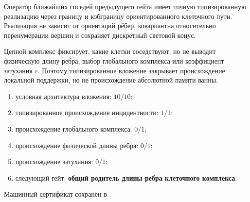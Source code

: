 \begin{theorem}
Оператор ближайших соседей предыдущего гейта имеет точную типизированную
реализацию через границу и кобграницу ориентированного клеточного пути.
Реализация не зависит от ориентаций рёбер, ковариантна относительно
перенумерации вершин и сохраняет дискретный световой конус.
\end{theorem}

\begin{nogocriterion}
Цепной комплекс фиксирует, какие клетки соседствуют, но не выводит физическую
длину ребра, выбор глобального комплекса или коэффициент затухания $r$.
Поэтому типизированное вложение закрывает происхождение локальной поддержки,
но не происхождение абсолютной памяти ванны.
\end{nogocriterion}

\begin{protocol}\begin{enumerate}
\item условная архитектура вложения: \textbf{$10/10$};
\item типизированное происхождение инцидентности: \textbf{$1/1$};
\item происхождение глобального комплекса: \textbf{$0/1$};
\item происхождение физической длины ребра: \textbf{$0/1$};
\item происхождение затухания: \textbf{$0/1$};
\item следующий гейт: \textbf{общий родитель длины ребра клеточного комплекса}.
\end{enumerate}\end{protocol}

Машинный сертификат сохранён в
.